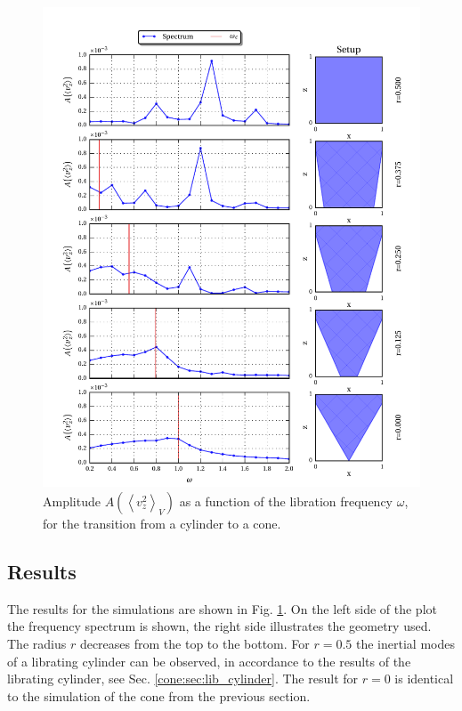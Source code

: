 \begin{figure}[!pt]
  \centering
  \includegraphics{gfx/cone/transition/transition.pdf}
  \caption{\label{fig:cone:transition}
      Amplitude $A\left(\left<v^2_z\right>_V\right)$ as a function of the libration frequency $\omega$,
      for the transition from a cylinder to a cone.
  }
\end{figure}

\subsection{Results}%

The results for the simulations are shown in Fig. \ref{fig:cone:transition}.
On the left side of the plot  the frequency spectrum is shown, the right side illustrates the geometry used.
The radius $r$ decreases from the top to the bottom.
For $r=0.5$  the inertial modes of a librating cylinder can be observed, in accordance
to the results of the librating  cylinder, see Sec. \ref{cone:sec:lib_cylinder}.
The result for $r=0$ is identical to the simulation of the cone from the previous section.

